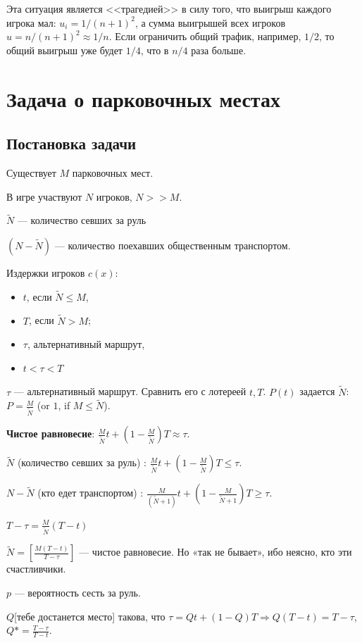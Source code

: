 Эта ситуация является <<трагедией>> в силу того, что выигрыш каждого игрока мал: $u_i=1/(n+1)^2$, а сумма выигрышей всех игроков $u=n/(n+1)^2\approx 1/n$. Если ограничить общий трафик, например, $1/2$, то общий выигрыш уже будет $1/4$, что в $n/4$ раза больше\cite[5]{agt2007}.


\chapter{Задача о парковочных местах}

\section{Постановка задачи}

Существует $M$ парковочных мест.

В игре участвуют $N$ игроков, $N >> M$.

$\tilde N$ --- количество севших за руль

$(N - \tilde N)$ --- количество поехавших общественным транспортом.

Издержки игроков $c(x)$:
\begin{itemize}
 \item  $t$, если $\tilde N\le M$,
 \item  $T$, если $\tilde N>M$;
 \item  $\tau$, альтернативный маршрут,
 \item  $t<\tau<T$
\end{itemize}

$\tau$ — альтернативный маршрут.
Сравнить его с лотереей ${t,T}$.
$P(t)$ задается $\tilde N$: $P=\frac{M}{\tilde{N}}$ (or $1$, if $M \le \tilde N$).

\textbf{Чистое равновесие}: $\frac{M}{\tilde N}t+(1-\frac{M}{\tilde{N}})T\approx\tau$.


$\tilde{N}$ (количество севших за руль) : $\frac{M}{\tilde{N}}t+(1-\frac{M}{\tilde{N}})T\le\tau$.

${N-\tilde N}$ (кто едет транспортом) : $\frac{M}{(\tilde{N}+1)}t+(1-\frac{M}{\tilde{N}+1})T\ge\tau$.

$T-\tau = \frac{M}{\tilde{N}}(T-t)$

$\tilde{N}=[\frac{M(T-t)}{T-\tau}]$ — чистое равновесие. Но «так не бывает», ибо неясно, кто эти счастливчики.

$p$ — вероятность сесть за руль.

$Q$[тебе достанется место] такова, что $\tau = Qt+(1-Q)T \Rightarrow Q(T-t)=T-\tau$, $Q*=\frac{T-\tau}{T-t}$.


